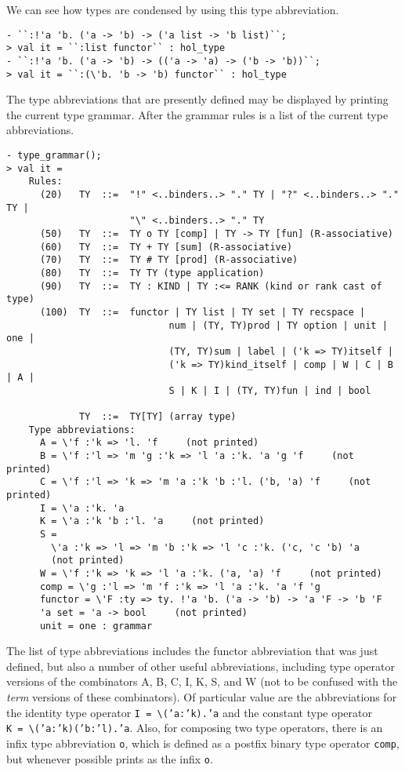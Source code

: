 We can see how types are condensed by using this type abbreviation.
\begin{session}
\begin{verbatim}
- ``:!'a 'b. ('a -> 'b) -> ('a list -> 'b list)``;
> val it = ``:list functor`` : hol_type
- ``:!'a 'b. ('a -> 'b) -> (('a -> 'a) -> ('b -> 'b))``;
> val it = ``:(\'b. 'b -> 'b) functor`` : hol_type
\end{verbatim}
\end{session}

The type abbreviations that are presently defined may be displayed by
printing the current type grammar.  After the grammar rules is a list of
the current type abbreviations.

\begin{session}
\begin{verbatim}
- type_grammar();
> val it =
    Rules:
      (20)   TY  ::=  "!" <..binders..> "." TY | "?" <..binders..> "." TY |
                      "\" <..binders..> "." TY
      (50)   TY  ::=  TY o TY [comp] | TY -> TY [fun] (R-associative)
      (60)   TY  ::=  TY + TY [sum] (R-associative)
      (70)   TY  ::=  TY # TY [prod] (R-associative)
      (80)   TY  ::=  TY TY (type application)
      (90)   TY  ::=  TY : KIND | TY :<= RANK (kind or rank cast of type)
      (100)  TY  ::=  functor | TY list | TY set | TY recspace |
                             num | (TY, TY)prod | TY option | unit | one |
                             (TY, TY)sum | label | ('k => TY)itself |
                             ('k => TY)kind_itself | comp | W | C | B | A |
                             S | K | I | (TY, TY)fun | ind | bool
    
             TY  ::=  TY[TY] (array type)
    Type abbreviations:
      A = \'f :'k => 'l. 'f     (not printed)
      B = \'f :'l => 'm 'g :'k => 'l 'a :'k. 'a 'g 'f     (not printed)
      C = \'f :'l => 'k => 'm 'a :'k 'b :'l. ('b, 'a) 'f     (not printed)
      I = \'a :'k. 'a
      K = \'a :'k 'b :'l. 'a     (not printed)
      S =
        \'a :'k => 'l => 'm 'b :'k => 'l 'c :'k. ('c, 'c 'b) 'a
        (not printed)
      W = \'f :'k => 'k => 'l 'a :'k. ('a, 'a) 'f     (not printed)
      comp = \'g :'l => 'm 'f :'k => 'l 'a :'k. 'a 'f 'g
      functor = \'F :ty => ty. !'a 'b. ('a -> 'b) -> 'a 'F -> 'b 'F
      'a set = 'a -> bool     (not printed)
      unit = one : grammar
\end{verbatim}
\end{session}

The list of type abbreviations includes the {\sf functor} abbreviation that
was just defined, but also a number of other useful abbreviations,
including type operator versions of the combinators
{\sf A}, {\sf B}, {\sf C}, {\sf I}, {\sf K}, {\sf S}, and {\sf W}
(not to be confused with the {\it term\/} versions of these
combinators).
Of particular value are the abbreviations for the identity type operator
{\tt I~=~}\verb|\|{\tt ('a:'k).'a}
and the constant type operator {\tt K~=~}\verb|\|{\tt ('a:'k)('b:'l).'a}.
Also, for composing two type operators,
there is an infix type abbreviation {\tt o},
which is defined as a postfix binary type operator {\tt comp},
but whenever possible prints as the infix {\tt o}.

